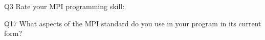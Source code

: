 \begin{description}%
\item{Q3} Rate your MPI programming skill:%
\item{Q17} What aspects of the MPI standard do you use in your program in its current form?%
\end{description}%
